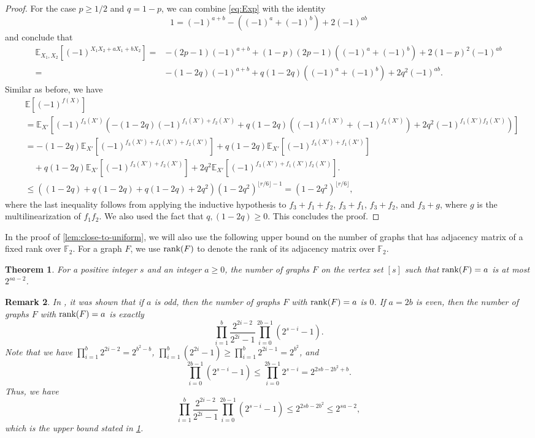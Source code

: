 \documentclass[reqno]{amsart}
\newtheorem{theorem}{Theorem}
\newtheorem{remark}[theorem]{Remark}
\theoremstyle{definition}
\numberwithin{theorem}{section}
\renewcommand{\leq}{\le}
\renewcommand{\geq}{\ge}
\renewcommand{\le}{\leqslant}
\renewcommand{\ge}{\geqslant}
\newcommand{\EE}{\mathbb E}
\newcommand{\F}{\mathbb{F}}
\newcommand{\rank}{\textup{rank}}
\begin{document}
\begin{proof}
    For the case $p\geq 1/2$ and $q=1-p$, we can combine \cref{eq:Exp} with the identity
    \[1=(-1)^{a+b}-((-1)^a + (-1)^b)+2(-1)^{ab}\]
    and conclude that
    \begin{align*}
        \EE_{X_1,X_2}[(-1)^{X_1X_2+aX_1+bX_2}] =&-(2p-1)(-1)^{a+b}+ (1-p)(2p-1)((-1)^a+(-1)^b)+2(1-p)^2(-1)^{ab}\\
        =& -(1-2q)(-1)^{a+b}+q(1-2q)((-1)^a+(-1)^b)+2q^2(-1)^{ab}.      
    \end{align*}
    Similar as before, we have
    \begin{align*}
        &\EE[(-1)^{f(X)}]\\
        &=\EE_{X'}\left[(-1)^{f_3(X')}\left(-(1-2q)(-1)^{f_1(X')+f_2(X')} + q(1-2q)((-1)^{f_1(X')}+(-1)^{f_2(X')})+2q^2(-1)^{f_1(X')f_2(X')}\right)\right]\\
        &=-(1-2q)\EE_{X'}\left[(-1)^{f_3(X')+f_1(X')+f_2(X')}\right]+q(1-2q)\EE_{X'}\left[(-1)^{f_3(X')+f_1(X')}\right]\\
        &\quad+q(1-2q)\EE_{X'}\left[(-1)^{f_3(X')+f_2(X')}\right]+2q^2\EE_{X'}\left[(-1)^{f_3(X')+f_1(X')f_2(X')}\right].\\
        &\leq \left((1-2q)+q(1-2q)+q(1-2q)+2q^2\right)(1-2q^2)^{\lfloor r/6\rfloor-1}=(1-2q^2)^{\lfloor r/6\rfloor},
    \end{align*}
    where the last inequality follows from applying the inductive hypothesis to $f_3+f_1+f_2$, $f_3+f_1$, $f_3+f_2$, and $f_3+g$, where $g$ is the multilinearization of $f_1f_2$. We also used the fact that $q,(1-2q)\geq 0$.
    This concludes the proof.
\end{proof}

In the proof of \cref{lem:close-to-uniform}, we will also use the following upper bound on the number of graphs that has adjacency matrix of a fixed rank over $\F_2$. For a graph $F$, we use $\rank(F)$ to denote the rank of its adjacency matrix over $\F_2$.


\begin{theorem}\cite[Theorem 3]{Mac69}\label{lemma:rank_bound} For a positive integer $s$ and an integer $a\ge 0$, the number of graphs $F$ on the vertex set $[s]$ such that $\rank(F) = a$ is at most $2^{sa-2}$. 
\end{theorem}

\begin{remark}
In \cite[Theorem 3]{Mac69}, it was shown that if $a$ is odd, then the number of graphs $F$ with $\rank(F) = a$ is $0$. If $a=2b$ is even, then the number of graphs $F$ with $\rank(F) = a$ is exactly
        \[\prod_{i=1}^{b}\frac{2^{2i-2}}{2^{2i}-1}
\prod_{i=0}^{2b-1}(2^{s-i}-1).\]
Note that we have $\prod_{i=1}^{b}2^{2i-2}=2^{b^2-b}$, $\prod_{i=1}^{b}(2^{2i}-1)\geq \prod_{i=1}^{b}2^{2i-1}=2^{b^2}$, and 
\[\prod_{i=0}^{2b-1}(2^{s-i}-1)\leq \prod_{i=0}^{2b-1}2^{s-i}=2^{2sb-2b^2+b}.\] 
Thus, we have
        \[\prod_{i=1}^{b}\frac{2^{2i-2}}{2^{2i}-1}
\prod_{i=0}^{2b-1}(2^{s-i}-1)\leq 2^{2sb-2b^2}\leq 2^{sa-2},\]
which is the upper bound stated in \cref{lemma:rank_bound}.
\end{remark}
\end{document}
